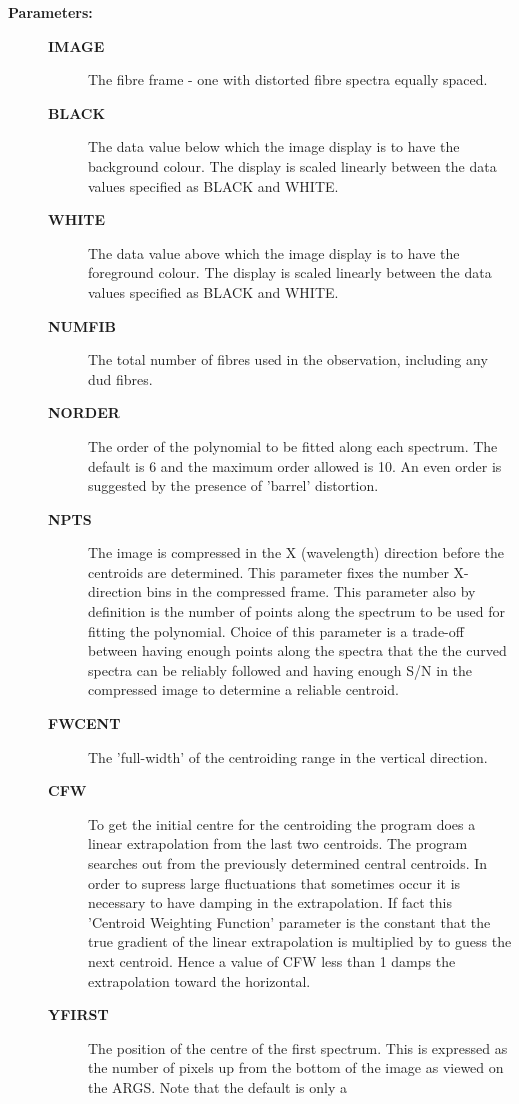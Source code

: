 \begin{description}
\item [{\bf Parameters:}]
\begin{description}
\item [{\bf IMAGE}]
 The fibre frame - one with distorted fibre spectra equally
 spaced.
\item [{\bf BLACK}]
 The data value below which the image display is to have the
 background colour. The display is scaled linearly between the
 data values specified as BLACK and WHITE.
\item [{\bf WHITE}]
 The data value above which the image display is to have the
 foreground colour. The display is scaled linearly between the
 data values specified as BLACK and WHITE.
\item [{\bf NUMFIB}]
 The total number of fibres used in the observation, including
 any dud fibres.
\item [{\bf NORDER}]
 The order of the polynomial to be fitted along each spectrum.
 The default is 6 and the maximum order allowed is 10. An even
 order is suggested by the presence of 'barrel' distortion.
\item [{\bf NPTS}]
 The image is compressed in the X (wavelength) direction before
 the centroids are determined. This parameter fixes the number
 X-direction bins in the compressed frame.  This parameter also
 by definition is the number of points along the spectrum to be
 used for fitting the polynomial. Choice of this parameter is a
 trade-off between having enough points along the spectra that
 the the curved spectra can be reliably followed and having
 enough S/N in the compressed image to determine a reliable
 centroid.
\item [{\bf FWCENT}]
 The 'full-width' of the centroiding range in the vertical
 direction.
\item [{\bf CFW}]
 To get the initial centre for the centroiding the program does
 a linear extrapolation from the last two centroids. The program
 searches out from the previously determined central centroids.
 In order to supress large fluctuations that sometimes occur it
 is necessary to have damping in the extrapolation.  If fact
 this 'Centroid Weighting Function' parameter is the constant
 that the true gradient of the linear extrapolation is
 multiplied by to guess the next centroid. Hence a value of CFW
 less than 1 damps the extrapolation toward the horizontal.
\item [{\bf YFIRST}]
 The position of the centre of the first spectrum. This is
 expressed as the number of pixels up from the bottom of the
 image as viewed on the ARGS.  Note that the default is only a

\end{description}
\end{description}
